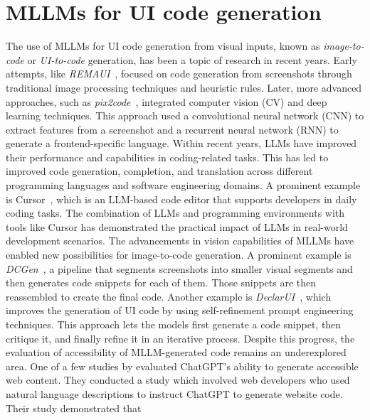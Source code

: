 \section{MLLMs for UI code generation}
The use of MLLMs for UI code generation from visual inputs, 
known as \textit{image-to-code} or \textit{UI-to-code} generation, has 
been a topic of research in recent years.
Early attempts, like \textit{REMAUI}~\parencite{nguyen2015reverse}, focused on
code generation from screenshots through traditional image processing 
techniques and heuristic rules. Later, more advanced approaches, such as 
\textit{pix2code}~\parencite{beltramelli2017pix2code}, integrated 
computer vision (CV) and deep learning techniques. This 
approach used a convolutional neural network (CNN) to extract
features from a screenshot and a recurrent neural network (RNN) to 
generate a frontend-specific language.\newline
Within recent years, LLMs have improved their performance 
and capabilities in coding-related tasks. This has led to improved 
code generation, completion, and translation across different 
programming languages and software engineering domains. 
A prominent example is Cursor~\cite{web:cursor}, which is 
an LLM-based code editor that supports developers in daily 
coding tasks. The combination of LLMs and programming environments 
with tools like Cursor has demonstrated the practical impact of LLMs 
in real-world development scenarios.\newline
The advancements in vision capabilities of MLLMs have 
enabled new possibilities for image-to-code generation.
A prominent example is \textit{DCGen}~\parencite{wan2024dcgen}, 
a pipeline that segments screenshots into smaller visual segments 
and then generates code snippets for each of them. Those 
snippets are then reassembled to create the final code.
Another example is \textit{DeclarUI}~\parencite{zhou2024declarui}, which
improves the generation of UI code by using self-refinement 
prompt engineering techniques. This approach lets the
models first generate a code snippet, then critique it, and 
finally refine it in an iterative process.\newline
Despite this progress, the evaluation of accessibility of 
MLLM-generated code remains an underexplored area. One of 
a few studies by \textcite{aljedaani2024chatgpt} evaluated 
ChatGPT's ability to generate accessible web content. 
They conducted a study which involved web developers who 
used natural language descriptions to instruct ChatGPT to
generate website code. Their study demonstrated that 
